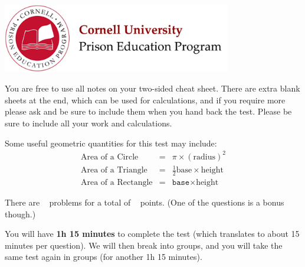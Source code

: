 \documentclass[addpoints,12pt]{exam}
\begin{document}

\begin{flushright}
\vspace{0.2in}

\end{flushright}

\begin{center}
\includegraphics[width=10cm]{../images/logo.png}
\end{center}

\begin{center}
\end{center}

\vspace{0.5in}

\begin{large}
You are free to use all notes on your two-sided cheat sheet. There are extra blank sheets at the end, which can be used for calculations, and if you require more please ask and be sure to include them when you hand back the test. Please be sure to include all your work and calculations.

Some useful geometric quantities for this test may include:
\begin{eqnarray}
\textrm{Area of a Circle} &=& \pi\times(\textrm{radius})^2 \nonumber \\
\textrm{Area of a Triangle} &=& \frac{1}{2}\textrm{base}\times\textrm{height}  \nonumber \\
\textrm{Area of a Rectangle} &=& \texttt{base}\times\textrm{height}\nonumber
\end{eqnarray}

There are \numquestions ~ problems for a total of \numpoints ~ points. (One of the questions is a bonus though.)

You will have \textbf{1h 15 minutes} to complete the test (which translates to about 15 minutes per question). We will then break into groups, and you will take the same test again in groups (for another 1h 15 minutes).

\end{large}
\vspace{0.2in}
\end{document}
